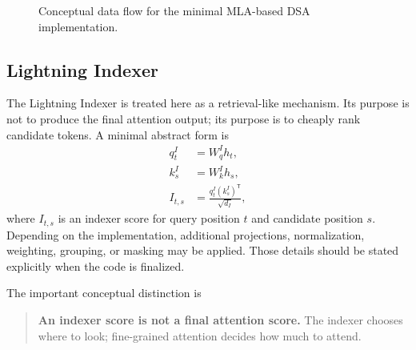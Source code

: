 \documentclass[11pt]{article}
\begin{document}
\begin{figure}[H]
\centering
{}
\caption{Conceptual data flow for the minimal MLA-based DSA implementation.}
\label{fig:overview}
\end{figure}

\subsection{Lightning Indexer}

The Lightning Indexer is treated here as a retrieval-like mechanism. Its
purpose is not to produce the final attention output; its purpose is to cheaply
rank candidate tokens. A minimal abstract form is
\begin{align}
    q_t^I &= W_q^I h_t,\\
    k_s^I &= W_k^I h_s,\\
    I_{t,s} &= \frac{q_t^I (k_s^I)^{\mathsf T}}{\sqrt{d_I}},
\end{align}
where $I_{t,s}$ is an indexer score for query position $t$ and candidate
position $s$. Depending on the implementation, additional projections,
normalization, weighting, grouping, or masking may be applied. Those details
should be stated explicitly when the code is finalized.

The important conceptual distinction is
\begin{quote}
\textbf{An indexer score is not a final attention score.} The indexer chooses
where to look; fine-grained attention decides how much to attend.
\end{quote}
\end{document}
